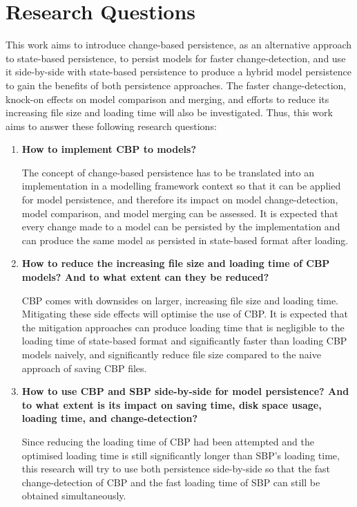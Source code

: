 \documentclass[12pt, a4paper]{report} \usepackage[titletoc]{appendix}
\begin{document}
\section{Research Questions}
\label{sec:research_questions}
This work aims to introduce change-based persistence, as an alternative approach to state-based persistence, to persist models for faster change-detection, and use it side-by-side with state-based persistence to produce a hybrid model persistence to gain the benefits of both persistence approaches. The faster change-detection, knock-on effects on model comparison and merging, and efforts to reduce its increasing file size and loading time will also be investigated. Thus, this work aims to answer these following research questions: 
\begin{enumerate} 
	\item \textbf{How to implement CBP to models?} 
	
	The concept of change-based persistence has to be translated into an implementation in a modelling framework context so that it can be applied for model persistence, and therefore its impact on model change-detection, model comparison, and model merging can be assessed. It is expected that every change made to a model can be persisted by the implementation and can produce the same model as persisted in state-based format after loading.
	
	\item \textbf{How to reduce the increasing file size and loading time of CBP models? And to what extent can they be reduced?} 
	
	CBP comes with downsides on larger, increasing file size and loading time. Mitigating these side effects will optimise the use of CBP. It is expected that the mitigation approaches can produce loading time that is negligible to the loading time of state-based format and significantly faster than loading CBP models naively, and significantly reduce file size compared to the naive approach of saving CBP files. 
	
	\item \textbf{How to use CBP and SBP side-by-side for model persistence? And to what extent is its impact on saving time, disk space usage, loading time, and change-detection?} 
	
	Since reducing the loading time of CBP had been attempted and the optimised loading time is still significantly longer than SBP's loading time, this research will try to use both persistence side-by-side so that the fast change-detection of CBP and the fast loading time of SBP can still be obtained simultaneously. 
	

\end{enumerate}
\end{document}
